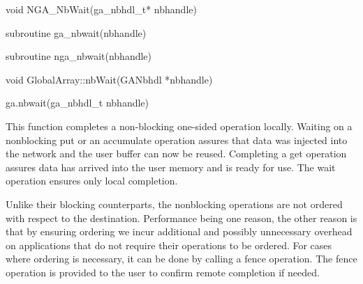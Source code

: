 \documentclass[10pt]{article}
\begin{document}


\begin{capi}
\begin{ccode}
void NGA_NbWait(ga_nbhdl_t* nbhandle)
\end{ccode}
\begin{funcargs}
\end{funcargs}
\end{capi}

\begin{fapi}
\begin{fcode}
subroutine ga_nbwait(nbhandle)
\end{fcode}
\begin{funcargs}
\end{funcargs}
\end{fapi}

\begin{fapi}
\begin{fcode}
subroutine nga_nbwait(nbhandle)
\end{fcode}
\begin{funcargs}
\end{funcargs}
\end{fapi}

\begin{cxxapi}
\begin{cxxcode}
void GlobalArray::nbWait(GANbhdl *nbhandle)
\end{cxxcode}
\begin{funcargs}
\end{funcargs}
\end{cxxapi}

\begin{pyapi}
\begin{pycode}
ga.nbwait(ga_nbhdl_t nbhandle)
\end{pycode}
\end{pyapi}

\ncoll

\begin{desc}
This function completes a non-blocking one-sided operation locally. Waiting on
a nonblocking put or an accumulate operation assures that data was injected
into the network and the user buffer can now be reused. Completing a get
operation assures data has arrived into the user memory and is ready for use.
The wait operation ensures only local completion.

Unlike their blocking counterparts, the nonblocking operations are not ordered
with respect to the destination. Performance being one reason, the other reason
is that by ensuring ordering we incur additional and possibly unnecessary
overhead on applications that do not require their operations to be ordered.
For cases where ordering is necessary, it can be done by calling a fence
operation. The fence operation is provided to the user to confirm remote
completion if needed.
\end{desc}
\end{document}
